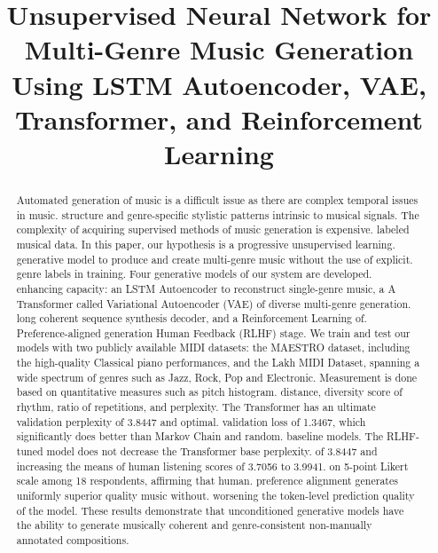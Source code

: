\documentclass[conference]{IEEEtran}
\begin{document}
\title{Unsupervised Neural Network for Multi-Genre Music Generation Using LSTM Autoencoder, VAE, Transformer, and Reinforcement Learning}

\author{
\and
{}
}

\maketitle

\begin{abstract}
Automated generation of music is a difficult issue as there are complex temporal issues in music.
structure and genre-specific stylistic patterns intrinsic to musical signals.
The complexity of acquiring supervised methods of music generation is expensive.
labeled musical data. In this paper, our hypothesis is a progressive unsupervised learning.
generative model to produce and create multi-genre music without the use of explicit.
genre labels in training. Four generative models of our system are developed.
enhancing capacity: an LSTM Autoencoder to reconstruct single-genre music, a
A Transformer called Variational Autoencoder (VAE) of diverse multi-genre generation.
long coherent sequence synthesis decoder, and a Reinforcement Learning of.
Preference-aligned generation Human Feedback (RLHF) stage. We train and
test our models with two publicly available MIDI datasets: the MAESTRO dataset,
including the high-quality Classical piano performances, and the Lakh MIDI Dataset,
spanning a wide spectrum of genres such as Jazz, Rock, Pop and Electronic.
Measurement is done based on quantitative measures such as pitch histogram.
distance, diversity score of rhythm, ratio of repetitions, and perplexity. The
Transformer has an ultimate validation perplexity of 3.8447 and optimal.
validation loss of 1.3467, which significantly does better than Markov Chain and random.
baseline models. The RLHF-tuned model does not decrease the Transformer base perplexity.
of 3.8447 and increasing the means of human listening scores of 3.7056 to 3.9941.
on 5-point Likert scale among 18 respondents, affirming that human.
preference alignment generates uniformly superior quality music without.
worsening the token-level prediction quality of the model. These results demonstrate
that unconditioned generative models have the ability to generate musically coherent and
genre-consistent non-manually annotated compositions.
\end{abstract}
\end{document}
